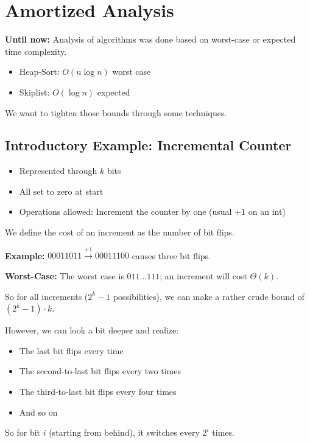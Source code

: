 \documentclass{article}
\begin{document}
\section{Amortized Analysis}

\textbf{Until now:} Analysis of algorithms was done based on worst-case or expected time complexity.

\begin{itemize}
    \item Heap-Sort: $O(n \log n)$ worst case
    \item Skiplist: $O(\log n)$ expected
\end{itemize}

We want to tighten those bounds through some techniques.


\subsection{Introductory Example: Incremental Counter}

\begin{itemize}
    \item Represented through $k$ bits
    \item All set to zero at start
    \item Operations allowed: Increment the counter by one (usual $+1$ on an int)
\end{itemize}

We define the cost of an increment as the number of bit flips.

\medskip
\noindent
\textbf{Example:} $00011011 \xrightarrow{+1} 00011100$ causes three bit flips.

\medskip
\noindent
\textbf{Worst-Case:} The worst case is $011\ldots111$; an increment will cost $\Theta(k)$.

So for all increments ($2^k - 1$ possibilities), we can make a rather crude bound of $(2^k - 1) \cdot k$.

However, we can look a bit deeper and realize:

\begin{itemize}
    \item The last bit flips every time
    \item The second-to-last bit flips every two times
    \item The third-to-last bit flips every four times
    \item And so on
\end{itemize}

So for bit $i$ (starting from behind), it switches every $2^i$ times.
\end{document}
